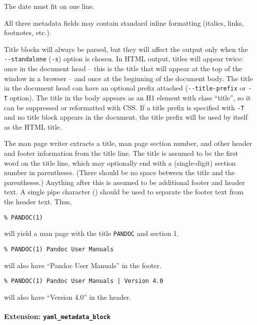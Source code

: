 \documentclass[
  a4paper,
]{article}
\begin{document}
The date must fit on one line.

All three metadata fields may contain standard inline formatting
(italics, links, footnotes, etc.).

Title blocks will always be parsed, but they will affect the output only
when the \texttt{-\/-standalone} (\texttt{-s}) option is chosen. In HTML
output, titles will appear twice: once in the document head -- this is
the title that will appear at the top of the window in a browser -- and
once at the beginning of the document body. The title in the document
head can have an optional prefix attached (\texttt{-\/-title-prefix} or
\texttt{-T} option). The title in the body appears as an H1 element with
class ``title'', so it can be suppressed or reformatted with CSS. If a
title prefix is specified with \texttt{-T} and no title block appears in
the document, the title prefix will be used by itself as the HTML title.

The man page writer extracts a title, man page section number, and other
header and footer information from the title line. The title is assumed
to be the first word on the title line, which may optionally end with a
(single-digit) section number in parentheses. (There should be no space
between the title and the parentheses.) Anything after this is assumed
to be additional footer and header text. A single pipe character
(\texttt{\textbar{}}) should be used to separate the footer text from
the header text. Thus,

\begin{verbatim}
% PANDOC(1)
\end{verbatim}

will yield a man page with the title \texttt{PANDOC} and section 1.

\begin{verbatim}
% PANDOC(1) Pandoc User Manuals
\end{verbatim}

will also have ``Pandoc User Manuals'' in the footer.

\begin{verbatim}
% PANDOC(1) Pandoc User Manuals | Version 4.0
\end{verbatim}

will also have ``Version 4.0'' in the header.

\hypertarget{extension-yaml_metadata_block}{%
\paragraph{\texorpdfstring{Extension:
\texttt{yaml\_metadata\_block}}{Extension: yaml\_metadata\_block}}\label{extension-yaml_metadata_block}}
\end{document}
